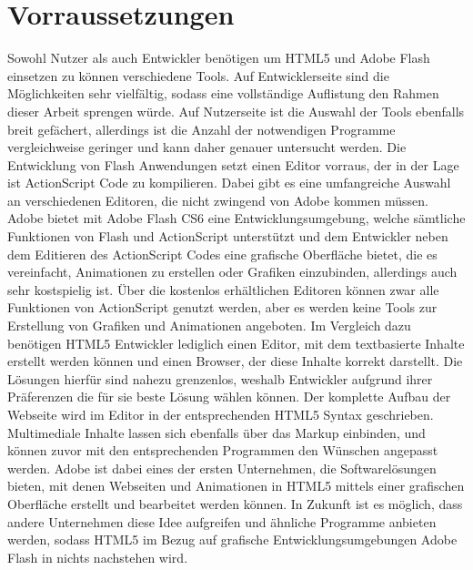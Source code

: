 \section{Vorraussetzungen}
Sowohl Nutzer als auch Entwickler benötigen um HTML5 und Adobe Flash einsetzen
zu können verschiedene Tools. Auf Entwicklerseite sind die Möglichkeiten sehr
vielfältig, sodass eine vollständige Auflistung den Rahmen dieser Arbeit
sprengen würde. Auf Nutzerseite ist die Auswahl der Tools ebenfalls breit
gefächert, allerdings ist die Anzahl der notwendigen Programme vergleichweise
geringer und kann daher genauer untersucht werden.
\newline\newline
Die Entwicklung von Flash Anwendungen setzt einen Editor vorraus, der in der
Lage ist ActionScript Code zu kompilieren. Dabei gibt es eine umfangreiche
Auswahl an verschiedenen Editoren, die nicht zwingend von Adobe kommen müssen.
Adobe bietet mit Adobe Flash CS6 eine Entwicklungsumgebung, welche sämtliche
Funktionen von Flash und ActionScript unterstützt und dem Entwickler neben dem
Editieren des ActionScript Codes eine grafische Oberfläche bietet, die es
vereinfacht, Animationen zu erstellen oder Grafiken einzubinden, allerdings
auch sehr kostspielig ist. Über die kostenlos erhältlichen Editoren können
zwar alle Funktionen von ActionScript genutzt werden, aber es werden keine
Tools zur Erstellung von Grafiken und Animationen angeboten.
\newline\newline
Im Vergleich dazu benötigen HTML5 Entwickler lediglich einen Editor, mit dem
textbasierte Inhalte erstellt werden können und einen Browser, der diese
Inhalte korrekt darstellt. Die Lösungen hierfür sind nahezu grenzenlos,
weshalb Entwickler aufgrund ihrer Präferenzen die für sie beste Lösung wählen
können. Der komplette Aufbau der Webseite wird im Editor in der entsprechenden
HTML5 Syntax geschrieben. Multimediale Inhalte lassen sich ebenfalls über das
Markup einbinden, und können zuvor mit den entsprechenden Programmen den
Wünschen angepasst werden. Adobe ist dabei eines der ersten Unternehmen, die
Softwarelösungen bieten, mit denen Webseiten und Animationen in HTML5 mittels
einer grafischen Oberfläche erstellt und bearbeitet werden können. In Zukunft
ist es möglich, dass andere Unternehmen diese Idee aufgreifen und ähnliche
Programme anbieten werden, sodass HTML5 im Bezug auf grafische
Entwicklungsumgebungen Adobe Flash in nichts nachstehen wird.
\newline\newline
